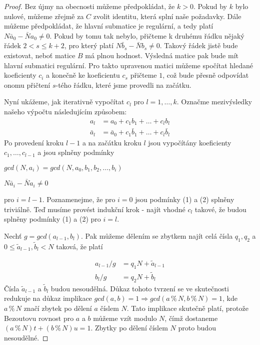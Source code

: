 \begin{proof}
Bez újmy na obecnosti můžeme předpokládat, že $ k > 0 $. Pokud by $ k $ bylo nulové,
můžeme zřejmě za $ C $ zvolit identitu, která splní naše požadavky.
Dále můžeme předpokládat, že hlavní submatice je regulární, a tedy platí
$ N \bar{a}_0 - \bar{N} a_0 \neq 0 $. Pokud by tomu tak nebylo, přičteme k druhému
řádku nějaký řádek $ 2 < s \leq k + 2 $, pro který platí
$ N \bar{b}_s - \bar{N} b_s \neq 0 $.
Takový řádek jistě bude existovat, neboť matice $ B $ má plnou hodnost. Výsledná
matice pak bude mít hlavní submatici regulární. Pro takto upravenou matici můžeme
spočítat hledané koeficienty $ c_i $ a konečně ke koeficientu $ c_s $ přičteme $ 1 $,
což bude přesně odpovídat onomu přičtení $ s $-tého řádku, které jsme provedli na
začátku.

Nyní ukážeme, jak iterativně vypočítat $ c_l $ pro $ l = 1,\dots,k $. Označme
mezivýsledky našeho výpočtu následujícím způsobem:
\begin{equation}\label{oznac}
    \begin{split}
        a_l &= a_0 + c_1 b_1 + \dots + c_l b_l \\
        \bar{a}_l &= \bar{a}_0 + c_1 \bar{b}_1 +\dots+c_l \bar{b}_l
    \end{split}
\end{equation}
Po provedení kroku $ l-1 $ a na začátku kroku $ l $ jsou vypočítány koeficienty
$ c_1, \dots, c_{l-1} $ a jsou splněny podmínky
\begin{center}
    \begin{CondNum}
        \item $ gcd(N, a_i) = gcd(N, a_0, b_1, b_2, \dots, b_i) $
        \item $ N \bar{a}_i - \bar{N} a_i \neq 0 $
    \end{CondNum}
\end{center}
pro $ i = l - 1 $. Poznamenejme, že pro $ i = 0 $ jsou podmínky (1)
a (2) splněny triviálně. Teď musíme provést
indukční krok - najít vhodné $ c_l $ takové, že budou splněny podmínky
(1) a (2) pro $ i = l $.

Nechť $ g = gcd(a_{l-1}, b_l) $. Pak můžeme dělením se zbytkem najít celá
čísla $ q_1, q_2 $ a
$ 0 \leq \tilde{a}_{l-1}, \tilde{b}_{l} < N $ taková, že platí

\begin{equation}\label{division}
    \begin{split}
        a_{l - 1} / g & = q_1 N +  \tilde{a}_{l-1} \\
        b_{l} / g & = q_2 N +  \tilde{b}_{l}
    \end{split}
\end{equation}
Čísla $ \tilde{a}_{l-1} $ a $ \tilde{b}_{l} $ budou nesoudělná. Důkaz tohoto
tvrzení se ve skutečnosti redukuje na důkaz implikace
$ gcd(a,b) = 1 \Rightarrow gcd(a \mathbin{\%} N, b \mathbin{\%} N) = 1 $, kde
$ a \mathbin{\%} N $ značí zbytek po dělení $ a $ číslem $ N $. Tato implikace
skutečně platí, protože Bezoutovu rovnost pro $ a $ a $ b $ můžeme vzít modulo
$ N $, čímž dostaneme $ (a \mathbin{\%} N) t + (b \mathbin{\%} N) u = 1 $. Zbytky
po dělení číslem $ N $ proto budou nesoudělné.


\end{proof}
